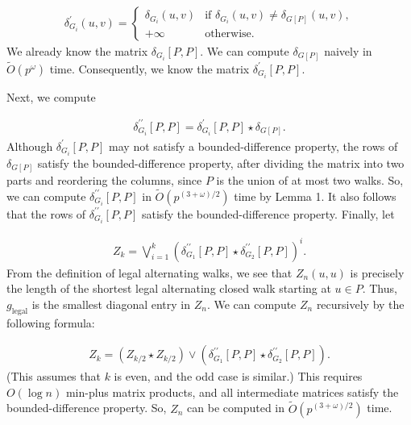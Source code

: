 \par
\[\begin{aligned}
\delta^{\prime}_{G_{i}}(u,v)=\begin{cases}\delta_{G_{i}}(u,v)&\text{if }\delta%
_{G_{i}}(u,v)\neq\delta_{G[P]}(u,v),\\
+\infty&\text{otherwise.}\end{cases}
\end{aligned}\]
We already know the matrix $\delta_{G_{i}}[P,P]$. We can compute $\delta_{G[P]}$ naively in $\widetilde{O}(p^{\omega})$ time. Consequently, we know the matrix $\delta^{\prime}_{G_{i}}[P,P]$.
\par
\par
Next, we compute
\par
\[\begin{aligned}
\delta^{\prime\prime}_{G_{i}}[P,P]=\delta^{\prime}_{G_{i}}[P,P]\star\delta_{G[%
P]}.
\end{aligned}\]
Although $\delta^{\prime}_{G_{i}}[P,P]$ may not satisfy a bounded-difference property, the rows of $\delta_{G[P]}$ satisfy the bounded-difference property, after dividing the matrix into two parts and reordering the columns, since $P$ is the union of at most two walks. So, we can compute $\delta^{\prime\prime}_{G_{i}}[P,P]$ in $\widetilde{O}(p^{(3+\omega)/2})$ time by Lemma 1. It also follows that the rows of $\delta^{\prime\prime}_{G_{i}}[P,P]$ satisfy the bounded-difference property. Finally, let
\par
\[\begin{aligned}
Z_{k}=\bigvee_{i=1}^{k}(\delta^{\prime\prime}_{G_{1}}[P,P]\star\delta^{\prime%
\prime}_{G_{2}}[P,P])^{i}.
\end{aligned}\]
From the definition of legal alternating walks, we see that $Z_{n}(u,u)$ is precisely the length of the shortest legal alternating closed walk starting at $u\in P$. Thus, $g_{\textrm{legal}}$ is the smallest diagonal entry in $Z_{n}$. We can compute $Z_{n}$ recursively by the following formula:
\par
\[\begin{aligned}
Z_{k}=(Z_{k/2}\star Z_{k/2})\vee(\delta^{\prime\prime}_{G_{1}}[P,P]\star\delta%
^{\prime\prime}_{G_{2}}[P,P]).
\end{aligned}\]
(This assumes that $k$ is even, and the odd case is similar.) This requires $O(\log n)$ min-plus matrix products, and all intermediate matrices satisfy the bounded-difference property. So, $Z_{n}$ can be computed in $\widetilde{O}(p^{(3+\omega)/2})$ time.

